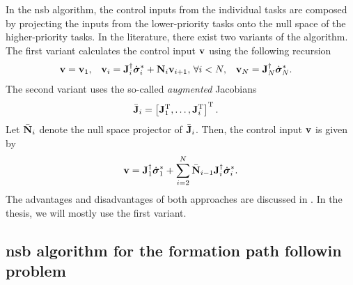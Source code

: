 In the \gls{nsb} algorithm, the control inputs from the individual tasks are composed by projecting the inputs from the lower-priority tasks onto the null space of the higher-priority tasks.
In the literature, there exist two variants of the algorithm.
The first variant calculates the control input $\mathbf{v}$ using the following recursion
\begin{align}
    \mathbf{v} &= \mathbf{v}_{1}, &
    \mathbf{v}_{i} &= \mathbf{J}_i^{\dagger} \dot{\bm{\sigma}}_i^{*} + \mathbf{N}_i \mathbf{v}_{i+1}, \, \forall i < N, &
    \mathbf{v}_{N} &= \mathbf{J}_N^{\dagger} \dot{\bm{\sigma}}_N^{*}.
\end{align}
The second variant uses the so-called \emph{augmented} Jacobians
\begin{align}
    \Bar{\mathbf{J}}_i &= \left[\mathbf{J}_1^{\mathrm{T}}, \ldots, \mathbf{J}_i^{\mathrm{T}}\right]^{\mathrm{T}}.
\end{align}
Let $\Bar{\mathbf{N}}_i$ denote the null space projector of $\Bar{\mathbf{J}}_i$.
Then, the control input $\mathbf{v}$ is given by
\begin{equation}
    \mathbf{v} = \mathbf{J}_1^{\dagger} \dot{\bm{\sigma}}_1^{*} + \sum_{i=2}^N \Bar{\mathbf{N}}_{i-1} \mathbf{J}_i^{\dagger} \dot{\bm{\sigma}}_i^{*}.
\end{equation}
The advantages and disadvantages of both approaches are discussed in \cite{antonelli_stability_2008}.
In the thesis, we will mostly use the first variant.

\subsection{\gls{nsb} algorithm for the formation path followin problem}

